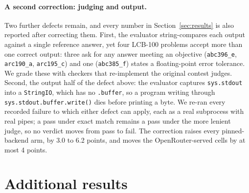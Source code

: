 \documentclass{article}
\begin{document}
\paragraph{A second correction: judging and output.} Two further defects remain, and every number
in Section~\ref{sec:results} is also reported after correcting them. First, the evaluator
string-compares each output against a single reference answer, yet four LCB-100 problems accept
more than one correct output: three ask for any answer meeting an objective
(\texttt{abc396\_e}, \texttt{arc190\_a}, \texttt{arc195\_c}) and one (\texttt{abc385\_f}) states
a floating-point error tolerance. We grade these with checkers that re-implement the original
contest judges. Second, the output half of the defect above: the evaluator captures
\texttt{sys.stdout} into a \texttt{StringIO}, which has no \texttt{.buffer}, so a program writing
through \texttt{sys.stdout.buffer.write()} dies before printing a byte. We re-ran every recorded
failure to which either defect can apply, each as a real subprocess with real pipes; a pass under
exact match remains a pass under the more lenient judge, so no verdict moves from pass to fail.
The correction raises every pinned-backend arm, by 3.0 to 6.2 points, and moves the
OpenRouter-served cells by at most 4 points.

\section{Additional results}
\label{app:results}




\end{document}
